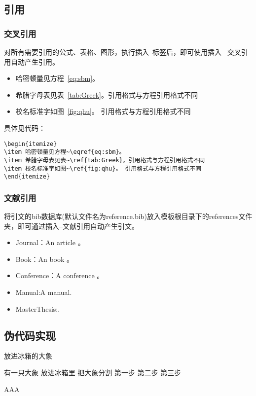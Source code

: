 \subsection{引用}
\subsubsection{交叉引用}
对所有需要引用的公式、表格、图形，执行插入--标签后，即可使用插入-- 交叉引用自动产生引用。
\begin{itemize}
\item 哈密顿量见方程~\eqref{eq:sbm}。
\item 希腊字母表见表~\ref{tab:Greek}。引用格式与方程引用格式不同
\item 校名标准字如图~\ref{fig:qhu}。 引用格式与方程引用格式不同
\end{itemize}
具体见代码：
\begin{verbatim}
\begin{itemize}
\item 哈密顿量见方程~\eqref{eq:sbm}。
\item 希腊字母表见表~\ref{tab:Greek}。引用格式与方程引用格式不同
\item 校名标准字如图~\ref{fig:qhu}。 引用格式与方程引用格式不同
\end{itemize}
\end{verbatim}
\subsubsection{文献引用}
将引文的bib数据库(默认文件名为reference.bib)放入模板根目录下的references文件夹，即可通过插入--文献引用自动产生引文。
\begin{itemize}
\item Journal：An article \cite{ELIDRISSI94,MELLINGER96,SHELL02,cnarticle}。
\item Book：An book \cite{IEEE-1363,tex,companion}。
\item Conference：A conference \cite{kocher99,DPMG,cnproceed}。
\item Manual:A manual\cite{NPB2}.
\item MasterThesis:\cite{zhubajie,metamori2004,shaheshang,FistSystem01}.
\end{itemize}
\subsection{伪代码实现}
\begin{algorithm}
\caption{放进冰箱的大象}\label{算法实例}
\begin{algorithmic}
	\REQUIRE 有一只大象
	\ENSURE 放进冰箱里
	\STATE 把大象分割
	\ENDIF
	\ENDFOR
	\STATE 第一步
	\STATE 第二步
	\STATE 第三步
\end{algorithmic}
AAA\end{algorithm}
